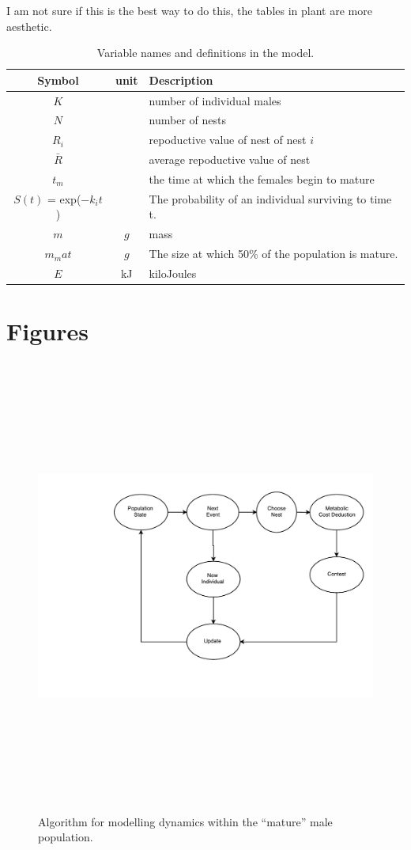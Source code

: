 \documentclass[a4paper,11pt]{article}
\begin{document}
I am not sure if this is the best way to do this, the tables in plant are more aesthetic. 
\begin{table}[h!]
    \caption{Variable names and definitions in the model.}
    \centering
    \begin{tabular}{c | c | l }
        \hline
        Symbol & unit & Description\\
        \hline
        \hline
        $K$ & & number of individual males \\
        $N$ & & number of nests \\
        $R_i$ & & repoductive value of nest of nest $i$\\
        $\bar{R}$ & & average repoductive value of nest\\
        \hline
        $t_m$ & & the time at which the females begin to mature\\
        $S(t)$ = exp($-k_it$) & & The probability of an individual surviving to time t.\\
        \hline
        $m$ & $g$ & mass\\
        $m_mat$ & $g$ & The size at which 50\% of the population is mature.\\
        $E$ & kJ & kiloJoules\\
        \hline
    \end{tabular}
\end{table}

\section{Figures}

\begin{figure}[h!]
\centering
\includegraphics[width=15cm,height=15cm,keepaspectratio]{figures/event_algorithm}
\caption{Algorithm for modelling dynamics within the ``mature'' male population.}
\label{fig:events}
\end{figure}
\clearpage
\end{document}
